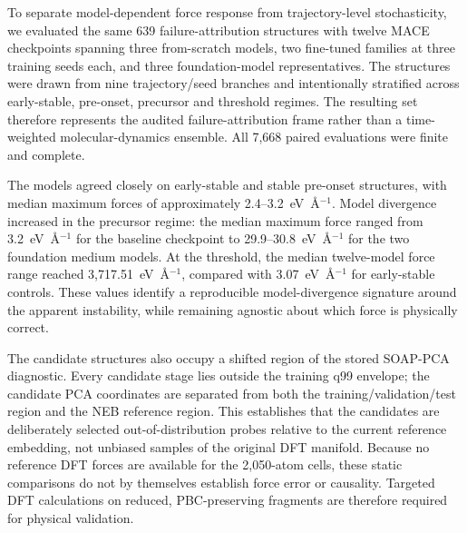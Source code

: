 To separate model-dependent force response from trajectory-level stochasticity, we evaluated the same 639 failure-attribution structures with twelve MACE checkpoints spanning three from-scratch models, two fine-tuned families at three training seeds each, and three foundation-model representatives. The structures were drawn from nine trajectory/seed branches and intentionally stratified across early-stable, pre-onset, precursor and threshold regimes. The resulting set therefore represents the audited failure-attribution frame rather than a time-weighted molecular-dynamics ensemble. All 7,668 paired evaluations were finite and complete.

The models agreed closely on early-stable and stable pre-onset structures, with median maximum forces of approximately 2.4--3.2~eV~\AA$^{-1}$. Model divergence increased in the precursor regime: the median maximum force ranged from 3.2~eV~\AA$^{-1}$ for the baseline checkpoint to 29.9--30.8~eV~\AA$^{-1}$ for the two foundation medium models. At the threshold, the median twelve-model force range reached 3,717.51~eV~\AA$^{-1}$, compared with 3.07~eV~\AA$^{-1}$ for early-stable controls. These values identify a reproducible model-divergence signature around the apparent instability, while remaining agnostic about which force is physically correct.

The candidate structures also occupy a shifted region of the stored SOAP-PCA diagnostic. Every candidate stage lies outside the training q99 envelope; the candidate PCA coordinates are separated from both the training/validation/test region and the NEB reference region. This establishes that the candidates are deliberately selected out-of-distribution probes relative to the current reference embedding, not unbiased samples of the original DFT manifold. Because no reference DFT forces are available for the 2,050-atom cells, these static comparisons do not by themselves establish force error or causality. Targeted DFT calculations on reduced, PBC-preserving fragments are therefore required for physical validation.
